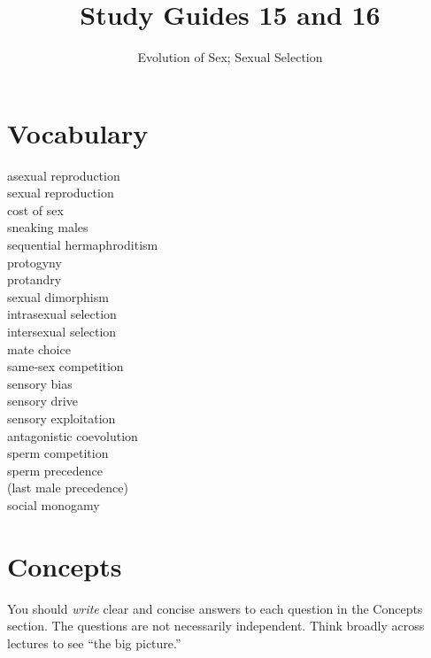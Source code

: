 \documentclass[letterpaper]{tufte-handout}
\title{Study Guides 15 and 16\hfill}
\author{Evolution of Sex; Sexual Selection}
\date{} %
\begin{document}
\maketitle	%


\section{Vocabulary}
\vspace{-1\baselineskip}
\begin{multicols}{2}
asexual reproduction\\
sexual reproduction\\
cost of sex\\
sneaking males\\
sequential hermaphroditism\\
protogyny\\
protandry\\
sexual dimorphism\\
intrasexual selection\\
intersexual selection\\
mate choice\\
same-sex competition\\
sensory bias\\
sensory drive\\
sensory exploitation\\
antagonistic coevolution\\
sperm competition\\
sperm precedence\\\hspace{1em}(last male precedence)\\
social monogamy
\end{multicols}

\section{Concepts}

You should \emph{write} clear and concise answers to each question in the Concepts section.  The questions are not necessarily independent.  Think broadly across lectures to see ``the big picture.'' 
\end{document}
